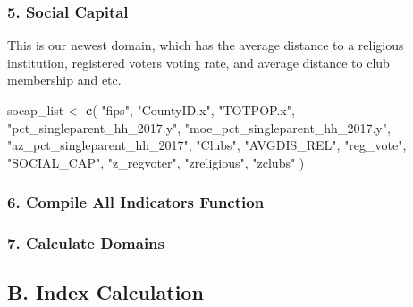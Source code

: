 \documentclass[]{article}
\newenvironment{Shaded}{\begin{snugshade}}{\end{snugshade}}
\newcommand{\KeywordTok}[1]{\textcolor[rgb]{0.13,0.29,0.53}{\textbf{#1}}}
\newcommand{\DecValTok}[1]{\textcolor[rgb]{0.00,0.00,0.81}{#1}}
\newcommand{\StringTok}[1]{\textcolor[rgb]{0.31,0.60,0.02}{#1}}
\newcommand{\CommentTok}[1]{\textcolor[rgb]{0.56,0.35,0.01}{\textit{#1}}}
\newcommand{\OperatorTok}[1]{\textcolor[rgb]{0.81,0.36,0.00}{\textbf{#1}}}
\newcommand{\NormalTok}[1]{#1}
\begin{document}
\subsubsection{5. Social Capital}\label{social-capital}

This is our newest domain, which has the average distance to a religious
institution, registered voters voting rate, and average distance to club
membership and etc.

\begin{Shaded}
\begin{Highlighting}[]
\NormalTok{socap_list <-}
\StringTok{  }\KeywordTok{c}\NormalTok{(}
  \StringTok{"fips"}\NormalTok{,}
  \StringTok{"CountyID.x"}\NormalTok{,}
  \StringTok{"TOTPOP.x"}\NormalTok{,}
  \StringTok{"pct_singleparent_hh_2017.y"}\NormalTok{,}
  \StringTok{"moe_pct_singleparent_hh_2017.y"}\NormalTok{,}
  \StringTok{"az_pct_singleparent_hh_2017"}\NormalTok{,}
  \StringTok{"Clubs"}\NormalTok{,}
  \StringTok{"AVGDIS_REL"}\NormalTok{,}
  \StringTok{"reg_vote"}\NormalTok{,}
  \StringTok{"SOCIAL_CAP"}\NormalTok{,}
  \StringTok{"z_regvoter"}\NormalTok{,}
  \StringTok{"zreligious"}\NormalTok{,}
  \StringTok{"zclubs"}
\NormalTok{  )}
\end{Highlighting}
\end{Shaded}

\subsubsection{6. Compile All Indicators
Function}\label{compile-all-indicators-function}

\subsubsection{7. Calculate Domains}\label{calculate-domains}

\subsection{B. Index Calculation}\label{b.-index-calculation}

\begin{Shaded}
\end{Shaded}
\end{document}
